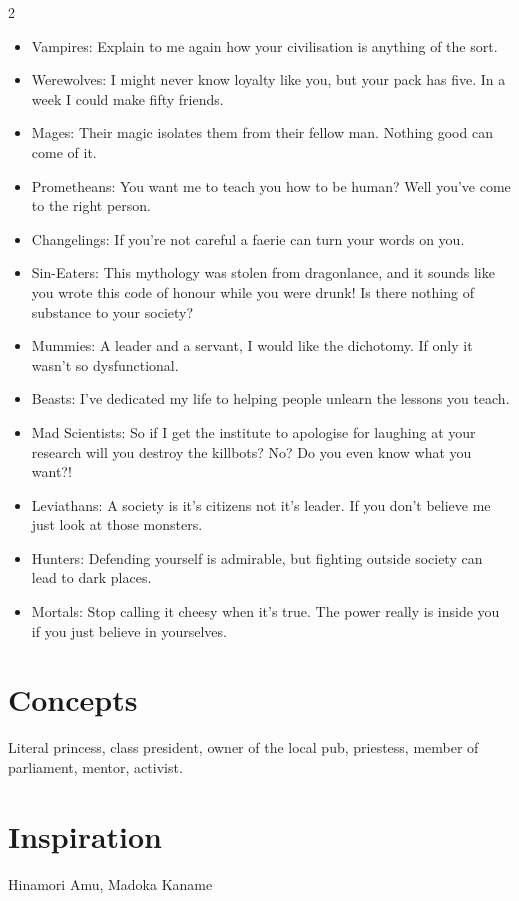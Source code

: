 \begin{multicols}{2}
\begin{itemize}
\item Vampires: Explain to me again how your civilisation is anything of the sort. 
\item Werewolves: I might never know loyalty like you, but your pack has five. In a week I could make fifty friends. 
\item Mages: Their magic isolates them from their fellow man. Nothing good can come of it. 
\item Prometheans: You want me to teach you how to be human? Well you've come to the right person. 
\item Changelings: If you're not careful a faerie can turn your words on you.
\item Sin-Eaters: This mythology was stolen from dragonlance, and it sounds like you wrote this code of honour while you were drunk! Is there nothing of substance to your society?
\item Mummies: A leader and a servant, I would like the dichotomy. If only it wasn't so dysfunctional. 
\item Beasts: I've dedicated my life to helping people unlearn the lessons you teach. 

\item Mad Scientists: So if I get the institute to apologise for laughing at your research will you destroy the killbots? No? Do you even know what you want?!
\item Leviathans: A society is it's citizens not it's leader. If you don't believe me just look at those monsters.

\item Hunters: Defending yourself is admirable, but fighting outside society can lead to dark places.
\item Mortals: Stop calling it cheesy when it's true. The power really is inside you if you just believe in yourselves. 
\end{itemize}

\section*{Concepts}

Literal princess, class president, owner of the local pub, priestess, member of parliament, mentor, activist. 

\section*{Inspiration}
Hinamori Amu, Madoka Kaname

\end{multicols}\newpage{}
